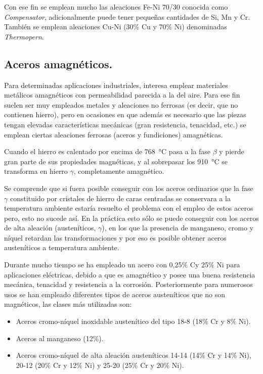 \documentclass[12pt,a4paper]{article}
\begin{document}
Con ese fin se emplean mucho las aleaciones Fe-Ni 70/30 conocida como \textit{Compensator}, adicionalmente puede tener pequeñas cantidades de Si, Mn y Cr. También se emplean aleaciones Cu-Ni (30\% Cu y 70\% Ni) denominadas \textit{Thermopern}.

\subsection{Aceros amagnéticos.}

Para determinadas aplicaciones industriales, interesa emplear materiales metálicos amagnéticos con permeabilidad parecida a la del aire. Para ese fin suelen ser muy empleados metales y aleaciones no ferrosas (es decir, que no contienen hierro), pero en ocasiones en que además es necesario que las piezas tengan elevadas características mecánicas (gran resistencia, tenacidad, etc.) se emplean ciertas aleaciones ferrosas (aceros y fundiciones) amagnéticas.

Cuando el hierro es calentado por encima de \SI{768}{\celsius} pasa a la fase $\beta$ y pierde gran parte de sus propiedades magnéticas, y al sobrepasar los \SI{910}{\celsius} se transforma en hierro $\gamma$, completamente amagnético.

Se comprende que si fuera posible conseguir con los aceros ordinarios que la fase $\gamma$ constituido por cristales de hierro de caras centradas se conservara a la temperatura ambiente estaría resuelto el problema con el empleo de estos aceros pero, esto no sucede así. En la práctica esto sólo se puede conseguir con los aceros de alta aleación (austeníticos, $\gamma$), en los que la presencia de manganeso, cromo y níquel retardan las transformaciones y por eso es posible obtener aceros austeníticos a temperatura ambiente.

Durante mucho tiempo se ha empleado un acero con 0,25\% Cy 25\% Ni para aplicaciones eléctricas, debido a que es amagnético y posee una buena resistencia mecánica, tenacidad y resistencia a la corrosión. Posteriormente para numerosos usos se han empleado diferentes tipos de aceros austeníticos que no son magnéticos, las clases más utilizadas son: 

\begin{itemize}
    \item Aceros cromo-níquel inoxidable austenítico del tipo 18-8 (18\% Cr y 8\% Ni).
    \item Aceros al manganeso (12\%).
    \item Aceros cromo-níquel de alta aleación austeníticos 14-14 (14\% Cr y 14\% Ni), 20-12 (20\% Cr y 12\% Ni) y 25-20 (25\% Cr y 20\% Ni).
\end{itemize}
\end{document}
